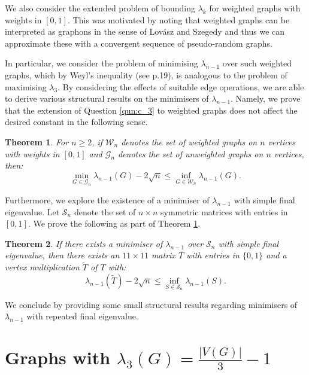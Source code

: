 \documentclass[12pt]{article}
\newtheorem{thm}{Theorem}[section]
\begin{document}
We also consider the extended problem of bounding $\lambda_k$ for weighted graphs with weights in $[0,1]$. This was motivated by noting that weighted graphs can be interpreted as graphons in the sense of Lov\'{a}sz and Szegedy \cite{LovaszGraphon} and thus we can approximate these with a convergent sequence of pseudo-random graphs. 

In particular, we consider the problem of minimising $\lambda_{n-1}$ over such weighted graphs, which by Weyl's inequality (see \cite{SpectraTextbook} p.19), is analogous to the problem of maximising $\lambda_3$. By considering the effects of suitable edge operations, we are able to derive various structural results on the minimisers of $\lambda_{n-1}$. Namely, we prove that the extension of Question \ref{qun:c_3} to weighted graphs does not affect the desired constant in the following sense.
\begin{thm}\label{thm:weighted-equivalent-intro}
    For $n \ge 2$, if $\mathcal{W}_n$ denotes the set of weighted graphs on $n$ vertices with weights in $[0,1]$ and $\mathcal{G}_n$ denotes the set of unweighted graphs on $n$ vertices, then:
\begin{equation*}
    \min_{G \in \mathcal{G}_n} \lambda_{n-1}(G) - 2\sqrt{n} \le \inf_{G\in \mathcal{W}_n} \lambda_{n-1}(G).
\end{equation*}
\end{thm}
Furthermore, we explore the existence of a minimiser of $\lambda_{n-1}$ with simple final eigenvalue. Let $\mathcal{S}_n$ denote the set of $n\times n$ symmetric matrices with entries in $[0,1]$. We prove the following as part of Theorem \ref{thm:weighted-equivalent-intro}. 
\begin{thm} If there exists a minimiser of $\lambda_{n-1}$ over $\mathcal{S}_n$ with simple final eigenvalue, then there exists an $11\times11$ matrix $T$ with entries in $\{0,1\}$ and a vertex multiplication $\tilde{T}$ of $T$ with:
\begin{equation*}
    \lambda_{n-1}(\tilde{T}) - 2\sqrt{n} \le  \inf_{S\in \mathcal{S}_n} \lambda_{n-1}(S).
\end{equation*}
\end{thm}

We conclude by providing some small structural results regarding minimisers of $\lambda_{n-1}$ with repeated final eigenvalue. 
\section{Graphs with $\lambda_3(G) = \frac{|V(G)|}{3}-1$}
\end{document}
